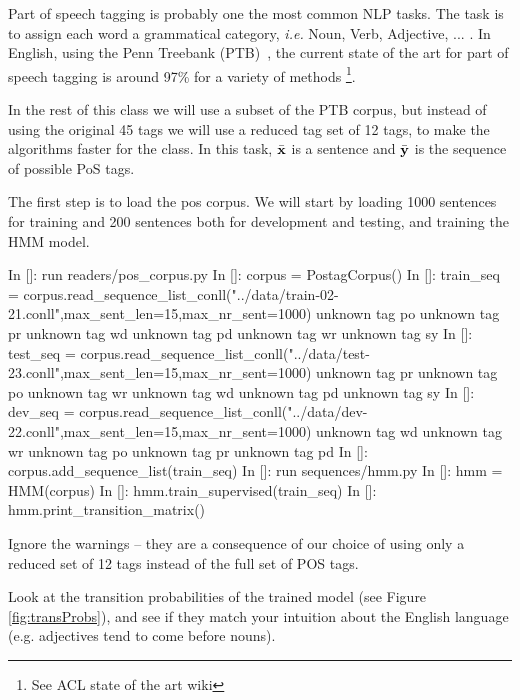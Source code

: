 Part of speech tagging is probably one the most common NLP tasks. The
task is to assign each word a grammatical category, \emph{i.e.} Noun,
Verb, Adjective, ... . In English, using the Penn Treebank (PTB)~\citep{pennTreeBank}, the current
state of the art for part of speech tagging is around 97\% for a
variety of methods \footnote{See ACL state of the art wiki}.

In the rest of this class we will use a subset of the PTB corpus, but
instead of using the original 45 tags we will use a reduced tag set of
12 tags, to make the algorithms faster for the
class. In this task, $\bar{\mathbf{x}}$ is a sentence and $\bar{\mathbf{y}}$
is the sequence of possible PoS tags.

The first step is to load the pos corpus. We will start by loading
1000 sentences for training and 200 sentences both for development and
testing, and training the HMM model.
\begin{python}
In []: run readers/pos_corpus.py
In []: corpus = PostagCorpus()
In []: train_seq = corpus.read_sequence_list_conll("../data/train-02-21.conll",max_sent_len=15,max_nr_sent=1000)
unknown tag po
unknown tag pr
unknown tag wd
unknown tag pd
unknown tag wr
unknown tag sy
In []: test_seq = corpus.read_sequence_list_conll("../data/test-23.conll",max_sent_len=15,max_nr_sent=1000)
unknown tag pr
unknown tag po
unknown tag wr
unknown tag wd
unknown tag pd
unknown tag sy
In []: dev_seq = corpus.read_sequence_list_conll("../data/dev-22.conll",max_sent_len=15,max_nr_sent=1000)
unknown tag wd
unknown tag wr
unknown tag po
unknown tag pr
unknown tag pd
In []: corpus.add_sequence_list(train_seq) 
In []: run sequences/hmm.py
In []: hmm = HMM(corpus)
In []: hmm.train_supervised(train_seq)
In []: hmm.print_transition_matrix()
\end{python}

Ignore the warnings -- they are a consequence of our choice of using only a reduced set of 12 tags instead of the full set of POS tags.


Look at the transition probabilities of the trained model
 (see
Figure \ref{fig:transProbs}), and see if they match your intuition
about the English language (e.g. adjectives tend to come before nouns).

